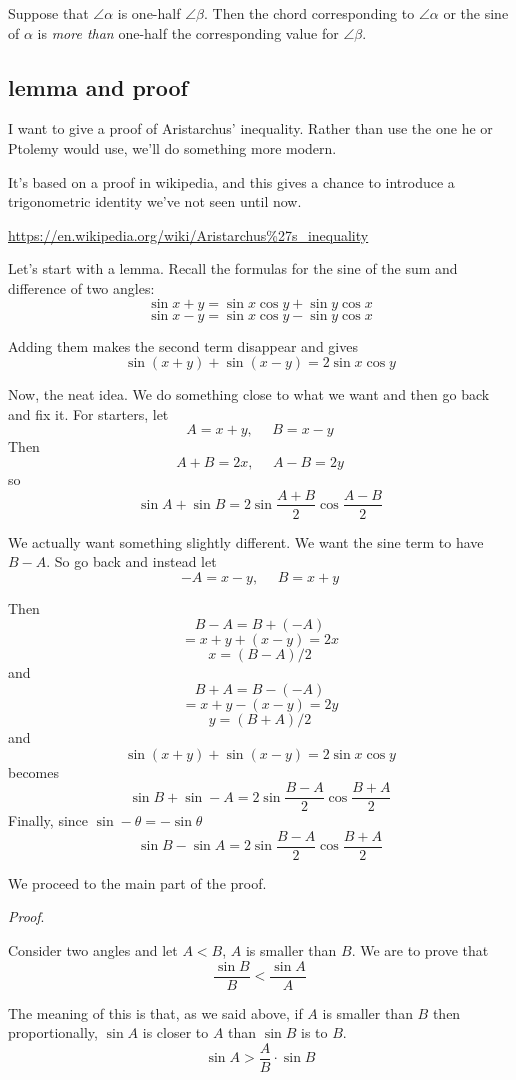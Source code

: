\documentclass[11pt, oneside]{article}
\begin{document}
Suppose that $\angle \alpha$ is one-half $\angle \beta$.  Then the chord corresponding to $\angle \alpha$ or the sine of $\alpha$ is \emph{more than} one-half the corresponding value for $\angle \beta$.

\subsection*{lemma and proof}
I want to give a proof of Aristarchus' inequality.  Rather than use the one he or Ptolemy would use, we'll do something more modern.  

It's based on a proof in wikipedia, and this gives a chance to introduce a trigonometric identity we've not seen until now.

\url{https://en.wikipedia.org/wiki/Aristarchus%27s_inequality}

Let's start with a lemma.  Recall the formulas for the sine of the sum and difference of two angles:
\[ \sin x + y = \sin x \cos y + \sin y \cos x \]
\[ \sin x - y = \sin x \cos y - \sin y \cos x \]

Adding them makes the second term disappear and gives
\[ \sin (x + y) + \sin (x - y) = 2 \sin x \cos y \]

Now, the neat idea.  We do something close to what we want and then go back and fix it.  For starters, let 
\[ A = x+y, \ \ \ \ \ \ B = x - y \]
Then
\[ A + B = 2x , \ \ \ \ \ \ A - B = 2y \]
so
\[ \sin A + \sin B = 2 \sin \frac{A + B}{2} \cos \frac{A - B}{2} \]

We actually want something slightly different.  We want the sine term to have $B - A$.  So go back and instead let
\[ -A = x - y, \ \ \ \ \ \ B = x + y \]

Then 
\[ B - A = B + (-A) \]
\[ = x + y + (x - y) = 2x \]
\[ x = (B - A)/2 \]
and
\[ B + A = B - (-A) \]
\[ = x + y - (x - y) = 2y \]
\[ y = (B + A)/2 \]
and
\[ \sin (x + y) + \sin (x - y) = 2 \sin x \cos y \]
becomes
\[ \sin B + \sin -A = 2 \sin \frac{B - A}{2} \cos \frac{B + A}{2} \]
Finally, since $\sin - \theta = - \sin \theta$
\[ \sin B - \sin A = 2 \sin \frac{B - A}{2} \cos \frac{B + A}{2} \]

We proceed to the main part of the proof.

\emph{Proof}.

Consider two angles and let $A < B$, $A$ is smaller than $B$.  We are to prove that
\[ \frac{\sin B}{B} < \frac{\sin A}{A} \]

The meaning of this is that, as we said above, if $A$ is smaller than $B$ then proportionally, $\sin A$ is closer to $A$ than $\sin B$ is to $B$.  
\[ \sin A > \frac{A}{B} \cdot \sin B \]
\end{document}
